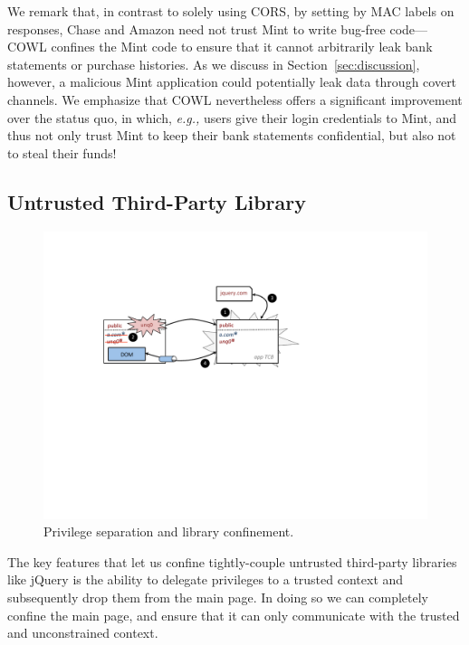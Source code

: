 We remark that, in contrast to solely using CORS, by setting by MAC
labels on responses, Chase and Amazon need not trust Mint to write
bug-free code---COWL confines the Mint code to ensure that it cannot
arbitrarily leak bank statements or purchase histories. As we discuss
in Section~\ref{sec:discussion}, however, a malicious Mint application
could potentially leak data through covert channels.  We emphasize
that COWL nevertheless offers a significant improvement over the
status quo, in which, \emph{e.g.,} users give their login credentials to
Mint, and thus not only trust Mint to keep their bank statements
confidential, but also not to steal their funds!

\subsection{Untrusted Third-Party Library}
\label{sec:apps-third-party}

\begin{figure}
\centerline{\includegraphics[width=\columnwidth]{jquery}}
\caption{\label{fig:jquery} Privilege separation and library
confinement.}
\end{figure}

The key features that let us confine tightly-couple untrusted
third-party libraries like jQuery is the ability to delegate
privileges to a trusted context and subsequently drop them from the
main page. In doing so we can completely confine the main page, and
ensure that it can only communicate with the trusted and unconstrained
context.

